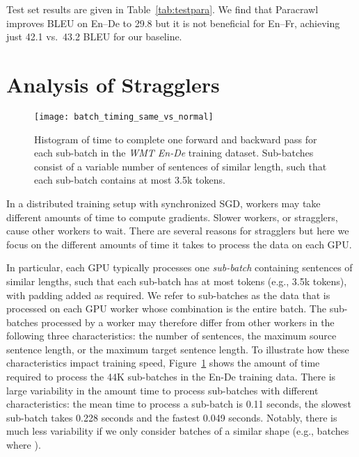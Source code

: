 \documentclass[11pt,a4paper]{article}
\begin{document}
Test set results are given in Table~\ref{tab:testpara}.
We find that Paracrawl improves BLEU on En--De to 29.8 but it is not beneficial for En--Fr, achieving just 42.1 vs.~43.2 BLEU for our baseline.

\section{Analysis of Stragglers}\label{sec:analysis}

\begin{figure}[t]
\begin{center}
\texttt{[image: batch\_timing\_same\_vs\_normal]}
\end{center}
\caption{
Histogram of time to complete one forward and backward pass for each sub-batch in the \emph{WMT En-De} training dataset.
Sub-batches consist of a variable number of sentences of similar length, such that each sub-batch contains at most 3.5k tokens.
}
\label{fig:batch_timing_same_vs_normal}
\end{figure}




In a distributed training setup with synchronized SGD, workers may take different amounts of time to compute gradients. 
Slower workers, or stragglers, cause other workers to wait. 
There are several reasons for stragglers but here we focus on the different amounts of time it takes to process the data on each GPU.

In particular, each GPU typically processes one \emph{sub-batch} containing sentences of similar lengths, such that each sub-batch has at most  tokens (e.g.,  3.5k tokens), with padding added as required. We refer to sub-batches as the data that is processed on each GPU worker whose combination is the entire batch.
The sub-batches processed by a worker may therefore differ from other workers in the following three characteristics: the number of sentences, the maximum source sentence length, or the maximum target sentence length.
To illustrate how these characteristics impact training speed, Figure~\ref{fig:batch_timing_same_vs_normal} shows the amount of time required to process the 44K sub-batches in the En-De training data.
There is large variability in the amount time to process sub-batches with different characteristics: the mean time to process a sub-batch is 0.11 seconds, the slowest sub-batch takes 0.228 seconds and the fastest 0.049 seconds.
Notably, there is much less variability if we only consider batches of a similar shape (e.g., batches where ).
\end{document}

